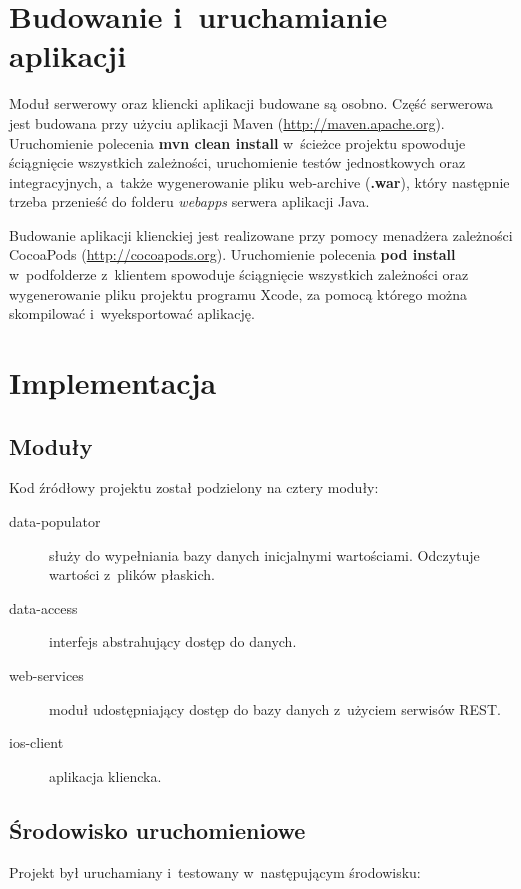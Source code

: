 \documentclass[a4paper,12pt]{article}
\begin{document}
	\section*{Budowanie i~uruchamianie aplikacji}

	Moduł serwerowy oraz kliencki aplikacji budowane są osobno. Część serwerowa jest budowana przy użyciu aplikacji Maven (\url{http://maven.apache.org}). Uruchomienie polecenia \textbf{mvn clean install} w~ścieżce projektu spowoduje ściągnięcie wszystkich zależności, uruchomienie testów jednostkowych oraz integracyjnych, a~także wygenerowanie pliku web-archive (\textbf{.war}), który następnie trzeba przenieść do folderu \emph{webapps} serwera aplikacji Java.

	Budowanie aplikacji klienckiej jest realizowane przy pomocy menadżera zależności CocoaPods (\url{http://cocoapods.org}). Uruchomienie polecenia \textbf{pod install} w~podfolderze z~klientem spowoduje ściągnięcie wszystkich zależności oraz wygenerowanie pliku projektu programu Xcode, za pomocą którego można skompilować i~wyeksportować aplikację.

	\section*{Implementacja}

	\subsection*{Moduły}

	Kod źródłowy projektu został podzielony na cztery moduły:

	\begin{description}
		\item[data-populator] służy do wypełniania bazy danych inicjalnymi wartościami. Odczytuje wartości z~plików płaskich.
		\item[data-access] interfejs abstrahujący dostęp do danych.
		\item[web-services] moduł udostępniający dostęp do bazy danych z~użyciem serwisów REST.
		\item[ios-client] aplikacja kliencka.
	\end{description}

	\subsection*{Środowisko uruchomieniowe}

	Projekt był uruchamiany i~testowany w~następującym środowisku:
\end{document}
